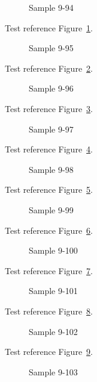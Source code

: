 \begin{figure}[tbhp]
\caption{Sample 9-94}
\label{fig:sample-9-94}
\end{figure}

Test reference Figure~\ref{fig:sample-9-94}.

\begin{figure}[tbhp]
\caption{Sample 9-95}
\label{fig:sample-9-95}
\end{figure}

Test reference Figure~\ref{fig:sample-9-95}.

\begin{figure}[tbhp]
\caption{Sample 9-96}
\label{fig:sample-9-96}
\end{figure}

Test reference Figure~\ref{fig:sample-9-96}.

\begin{figure}[tbhp]
\caption{Sample 9-97}
\label{fig:sample-9-97}
\end{figure}

Test reference Figure~\ref{fig:sample-9-97}.

\begin{figure}[tbhp]
\caption{Sample 9-98}
\label{fig:sample-9-98}
\end{figure}

Test reference Figure~\ref{fig:sample-9-98}.

\begin{figure}[tbhp]
\caption{Sample 9-99}
\label{fig:sample-9-99}
\end{figure}

Test reference Figure~\ref{fig:sample-9-99}.

\begin{figure}[tbhp]
\caption{Sample 9-100}
\label{fig:sample-9-100}
\end{figure}

Test reference Figure~\ref{fig:sample-9-100}.

\begin{figure}[tbhp]
\caption{Sample 9-101}
\label{fig:sample-9-101}
\end{figure}

Test reference Figure~\ref{fig:sample-9-101}.

\begin{figure}[tbhp]
\caption{Sample 9-102}
\label{fig:sample-9-102}
\end{figure}

Test reference Figure~\ref{fig:sample-9-102}.

\begin{figure}[tbhp]
\caption{Sample 9-103}
\label{fig:sample-9-103}
\end{figure}

